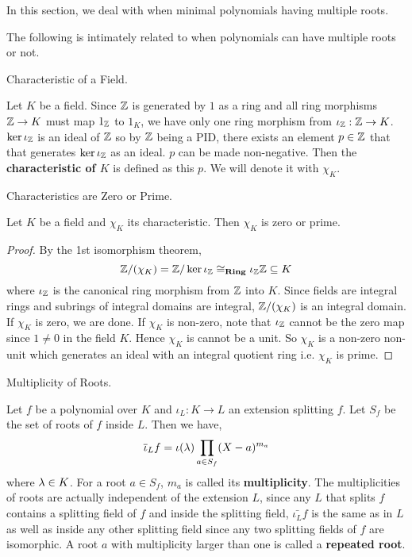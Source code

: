 \documentclass[../book.tex]{subfiles}
\begin{document}
In this section, we deal with when minimal polynomials having multiple roots.

\begin{rmk}
    The following is intimately related to when
    polynomials can have multiple roots or not.
\end{rmk}

\begin{dfn} Characteristic of a Field.
    
    Let $K$ be a field. 
    Since $\mathbb{Z}$ is generated by $1$ as a ring
    and all ring morphisms $\mathbb{Z} \to K$ must map $1_{\mathbb{Z}}$ to $1_K$,
    we have only one ring morphism from $\iota_{\mathbb{Z}} : \mathbb{Z} \to K$. 
    $\ker \iota_{\mathbb{Z}}$ is an ideal of $\mathbb{Z}$ so by $\mathbb{Z}$ being a PID,
    there exists an element $p \in \mathbb{Z}$
    that that generates $\ker \iota_{\mathbb{Z}}$ as an ideal.
    $p$ can be made non-negative. 
    Then the \textbf{characteristic of $K$} is defined as this $p$. 
    We will denote it with $\chi_K$. 
\end{dfn}
\begin{thm} Characteristics are Zero or Prime.
    
    Let $K$ be a field and $\chi_K$ its characteristic.
    Then $\chi_K$ is zero or prime. 
\end{thm}
\begin{proof}
    By the 1st isomorphism theorem, 
    \[ \mathbb{Z}/ (\chi_K) = \mathbb{Z} / \ker \iota_{\mathbb{Z}} \cong_{\mathbf{Ring}} \iota_{\mathbb{Z}} \mathbb{Z} \subseteq K\]
    where $\iota_{\mathbb{Z}}$ is the canonical ring morphism from $\mathbb{Z}$ into $K$.
    Since fields are integral rings
    and subrings of integral domains are integral,
    $\mathbb{Z} / (\chi_K)$ is an integral domain.
    If $\chi_K$ is zero, we are done.
    If $\chi_K$ is non-zero, note that $\iota_{\mathbb{Z}}$ cannot be the zero map
    since $1 \neq 0$ in the field $K$. 
    Hence $\chi_K$ is cannot be a unit. 
    So $\chi_K$ is a non-zero non-unit 
    which generates an ideal with an integral quotient ring
    i.e. $\chi_K$ is prime.
\end{proof}
\begin{dfn} Multiplicity of Roots.
    
    Let $f$ be a polynomial over $K$ and 
    $\iota_L : K \to L$ an extension splitting $f$.
    Let $S_f$ be the set of roots of $f$ inside $L$. 
    Then we have, \[
            \overline{\iota}_L f = \iota(\lambda) \prod_{a\in S_f} (X - a)^{m_a}
    \]
    where $\lambda \in K$. 
    For a root $a \in S_f$, $m_a$ is called its \textbf{multiplicity}.
    The multiplicities of roots are actually independent of the extension $L$,
    since any $L$ that splits $f$ contains a splitting field of $f$
    and inside the splitting field, $\bar{\iota_L} f$ is the same as in $L$
    as well as inside any other splitting field since 
    any two splitting fields of $f$ are isomorphic. 
    A root $a$ with multiplicity larger than one is called a \textbf{repeated root}.
\end{dfn}
\end{document}
